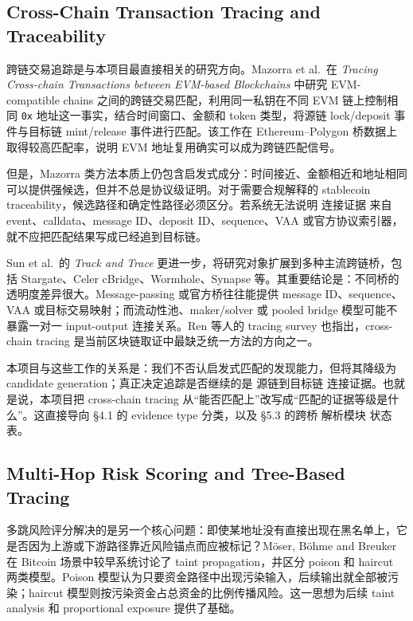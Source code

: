 \documentclass[12pt,a4paper]{ctexart}
\begin{document}
\hypertarget{cross-chain-transaction-tracing-and-traceability}{%
\subsection{Cross-Chain Transaction Tracing and
Traceability}\label{cross-chain-transaction-tracing-and-traceability}}

跨链交易追踪是与本项目最直接相关的研究方向。Mazorra et al.~在
\emph{Tracing Cross-chain Transactions between EVM-based Blockchains}
中研究 EVM-compatible chains 之间的跨链交易匹配，利用同一私钥在不同 EVM
链上控制相同 \texttt{0x} 地址这一事实，结合时间窗口、金额和 token
类型，将源链 lock/deposit 事件与目标链 mint/release
事件进行匹配。该工作在 Ethereum--Polygon 桥数据上取得较高匹配率，说明
EVM 地址复用确实可以成为跨链匹配信号。

但是，Mazorra
类方法本质上仍包含启发式成分：时间接近、金额相近和地址相同可以提供强候选，但并不总是协议级证明。对于需要合规解释的
stablecoin traceability，候选路径和确定性路径必须区分。若系统无法说明
连接证据 来自 event、calldata、message ID、deposit
ID、sequence、VAA 或官方协议索引器，就不应把匹配结果写成已经追到目标链。

Sun et al.~的 \emph{Track and Trace}
更进一步，将研究对象扩展到多种主流跨链桥，包括 Stargate、Celer
cBridge、Wormhole、Synapse
等。其重要结论是：不同桥的透明度差异很大。Message-passing
或官方桥往往能提供 message ID、sequence、VAA
或目标交易映射；而流动性池、maker/solver 或 pooled bridge
模型可能不暴露一对一 input-output 连接关系。Ren 等人的 tracing survey
也指出，cross-chain tracing 是当前区块链取证中最缺乏统一方法的方向之一。

本项目与这些工作的关系是：我们不否认启发式匹配的发现能力，但将其降级为
candidate generation；真正决定追踪是否继续的是 源链到目标链
连接证据。也就是说，本项目把 cross-chain tracing
从``能否匹配上''改写成``匹配的证据等级是什么''。这直接导向 §4.1 的
evidence type 分类，以及 §5.3 的跨桥 解析模块 状态表。

\hypertarget{multi-hop-risk-scoring-and-tree-based-tracing}{%
\subsection{Multi-Hop Risk Scoring and Tree-Based
Tracing}\label{multi-hop-risk-scoring-and-tree-based-tracing}}

多跳风险评分解决的是另一个核心问题：即使某地址没有直接出现在黑名单上，它是否因为上游或下游路径靠近风险锚点而应被标记？Möser,
Böhme and Breuker 在 Bitcoin 场景中较早系统讨论了 taint
propagation，并区分 poison 和 haircut 两类模型。Poison
模型认为只要资金路径中出现污染输入，后续输出就全部被污染；haircut
模型则按污染资金占总资金的比例传播风险。这一思想为后续 taint analysis 和
proportional exposure 提供了基础。
\end{document}
